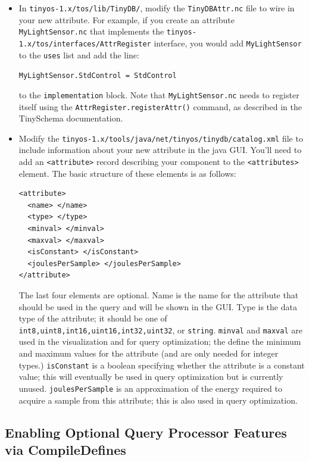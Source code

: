 \documentclass[11pt]{article}
\newcommand{\docroot}{tinyos-1.x}
\begin{document}
\begin{itemize}
\item In {\tt \docroot/tos/lib/TinyDB/}, modify the {\tt TinyDBAttr.nc} file to wire in your
new attribute.  For example, if you create an attribute {\tt MyLightSensor.nc} that implements
the {\tt \docroot/tos/interfaces/AttrRegister} interface, you would add {\tt MyLightSensor} to the
{\tt uses} list and add the line:

{\tt MyLightSensor.StdControl = StdControl}

\noindent to the {\tt implementation}  block.  Note that {\tt MyLightSensor.nc} needs to register
itself using the {\tt AttrRegister.registerAttr()} command, as described in the TinySchema documentation.

\item Modify the {\tt \docroot/tools/java/net/tinyos/tinydb/catalog.xml} file to include information
about your new attribute in the java GUI.  You'll need to add an {\tt <attribute>} record describing
 your component to the {\tt <attributes>}  element.  The basic structure of these elements is as follows:

\begin{verbatim}
<attribute>
  <name> </name>
  <type> </type>
  <minval> </minval>
  <maxval> </maxval>
  <isConstant> </isConstant>
  <joulesPerSample> </joulesPerSample>
</attribute>
\end{verbatim}

\noindent The last four elements are optional.  Name is the name for the attribute that should
be used in the query and will be shown in the GUI.  Type is the data type of the attribute;  it
should be one of {\tt int8,uint8,int16,uint16,int32,uint32}, or {\tt string}.  {\tt minval} and
{\tt maxval} are used in the visualization and for query optimization;  the define the minimum
and maximum values for the attribute (and are only needed for integer types.)  {\tt isConstant}
is a boolean specifying whether the attribute is a constant value;  this will eventually be
used in query optimization but is currently unused.  {\tt joulesPerSample} is an approximation
of the energy required to acquire a sample from this attribute;  this is also used in query
optimization.

\end{itemize}

\subsection{Enabling Optional Query Processor Features via CompileDefines}\label{sec:compile-defines}
\end{document}
